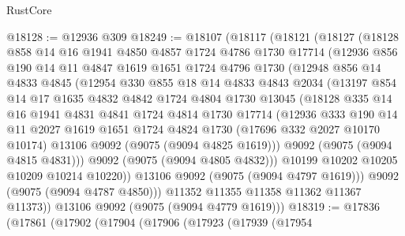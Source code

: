 \begin{lexlean}{RustCore}
\begin{coremodule}
@18128 := @12936 @309
@18249 := @18107
    (@18117
      (@18121
        (@18127
          (@18128
            @858
            @14
            @16
            @1941
            @4850
            @4857
            @1724
            @4786
            @1730
            @17714
            (@12936
              @856
              @190
              @14
              @11
              @4847
              @1619
              @1651
              @1724
              @4796
              @1730
              (@12948
                @856
                @14
                @4833
                @4845
                (@12954
                  @330
                  @855
                  @18
                  @14
                  @4833
                  @4843
                  @2034
                  (@13197
                    @854
                    @14
                    @17
                    @1635
                    @4832
                    @4842
                    @1724
                    @4804
                    @1730
                    @13045
                    (@18128
                      @335
                      @14
                      @16
                      @1941
                      @4831
                      @4841
                      @1724
                      @4814
                      @1730
                      @17714
                      (@12936
                        @333
                        @190
                        @14
                        @11
                        @2027
                        @1619
                        @1651
                        @1724
                        @4824
                        @1730
                        (@17696 @332 @2027 @10170 @10174)
                        @13106
                        @9092
                        (@9075 (@9094 @4825 @1619)))
                      @9092
                      (@9075 (@9094 @4815 @4831)))
                    @9092
                    (@9075 (@9094 @4805 @4832)))
                  @10199
                  @10202
                  @10205
                  @10209
                  @10214
                  @10220))
              @13106
              @9092
              (@9075 (@9094 @4797 @1619)))
            @9092
            (@9075 (@9094 @4787 @4850)))
          @11352
          @11355
          @11358
          @11362
          @11367
          @11373))
      @13106
      @9092
      (@9075 (@9094 @4779 @1619)))
@18319 := @17836
    (@17861
      (@17902
        (@17904
          (@17906
            (@17923
              (@17939
                (@17954

\end{coremodule}
\end{lexlean}
